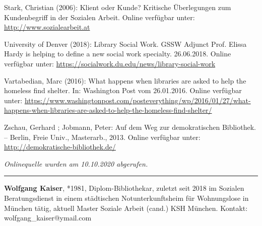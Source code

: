 \documentclass[a4paper,
fontsize=11pt,
oneside,
numbers=noperiodatend,
parskip=half-,
bibliography=totoc,
final
]{scrartcl}
\begin{document}
Stark, Christian (2006): Klient oder Kunde? Kritische Überlegungen zum
Kundenbegriff in der Sozialen Arbeit. Online verfügbar unter:
\url{http://www.sozialearbeit.at}

University of Denver (2018): Library Social Work. GSSW Adjunct Prof.
Elissa Hardy is helping to define a new social work specialty.
26.06.2018. Online verfügbar unter:
\url{https://socialwork.du.edu/news/library-social-work}

Vartabedian, Marc (2016): What happens when libraries are asked to help
the homeless find shelter. In: Washington Post vom 26.01.2016. Online
verfügbar unter:
\url{https://www.washingtonpost.com/posteverything/wp/2016/01/27/what-happens-when-libraries-are-asked-to-help-the-homeless-find-shelter/}

Zschau, Gerhard ; Jobmann, Peter: Auf dem Weg zur demokratischen
Bibliothek. -- Berlin, Freie Univ., Masterarb., 2013. Online verfügbar
unter: \url{http://demokratische-bibliothek.de/}

\emph{Onlinequelle wurden am 10.10.2020 abgerufen.}

\begin{center}\rule{0.5\linewidth}{0.5pt}\end{center}

\textbf{Wolfgang Kaiser}, *1981, Diplom-Bibliothekar, zuletzt seit 2018
im Sozialen Beratungsdienst in einem städtischen Notunterkunftsheim für
Wohnungslose in München tätig, aktuell Master Soziale Arbeit (cand.) KSH
München. Kontakt: wolfgang\_kaiser@ymail.com
\end{document}
